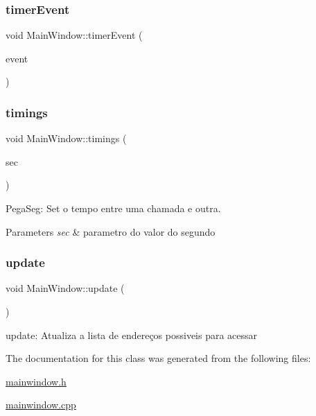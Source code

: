 \mbox{\label{class_main_window_aaa425b1554af3c1f58cc70b4815082ae}} 
\subsubsection{\texorpdfstring{timer\+Event}{timerEvent}}
{\footnotesize\ttfamily void Main\+Window\+::timer\+Event (\begin{DoxyParamCaption}\item[{Q\+Timer\+Event $\ast$}]{event }\end{DoxyParamCaption})\hspace{0.3cm}{\ttfamily [slot]}}

\mbox{\label{class_main_window_ad4393fd0668b17a585c39d8824d9a275}} 
\subsubsection{\texorpdfstring{timings}{timings}}
{\footnotesize\ttfamily void Main\+Window\+::timings (\begin{DoxyParamCaption}\item[{int}]{sec }\end{DoxyParamCaption})\hspace{0.3cm}{\ttfamily [slot]}}



Pega\+Seg\+: Set o tempo entre uma chamada e outra. 


\begin{DoxyParams}{Parameters}
{\em sec} & parametro do valor do segundo \\
\hline
\end{DoxyParams}
\mbox{\label{class_main_window_a128f71880d4b9683149023fc46fcc9f8}} 
\subsubsection{\texorpdfstring{update}{update}}
{\footnotesize\ttfamily void Main\+Window\+::update (\begin{DoxyParamCaption}{ }\end{DoxyParamCaption})\hspace{0.3cm}{\ttfamily [slot]}}



update\+: Atualiza a lista de endereços possiveis para acessar 



The documentation for this class was generated from the following files\+:\begin{DoxyCompactItemize}
\item 
\mbox{\hyperlink{mainwindow_8h}{mainwindow.\+h}}\item 
\mbox{\hyperlink{mainwindow_8cpp}{mainwindow.\+cpp}}\end{DoxyCompactItemize}

